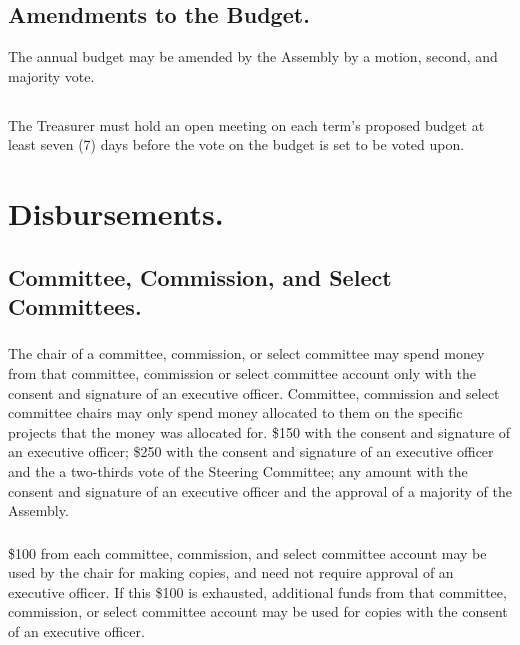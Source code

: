 \subsection{Amendments to the Budget.}
The annual budget may be amended by the Assembly by a motion, second, and majority vote.

\subsection{}
The Treasurer must hold an open meeting on each term's proposed budget at least seven (7) days before the vote on the budget is set to be voted upon.


\section{Disbursements.}

\subsection{Committee, Commission, and Select Committees.}  

\subsubsection{}
The chair of a committee, commission, or select committee may spend money from that committee, commission or select committee account only with the consent and signature of an executive officer. Committee, commission and select committee chairs may only spend money allocated to them on the specific projects that the money was allocated for.
\subsubsubsection{}
\$150 with the consent and signature of an executive officer;
\subsubsubsection{}
\$250 with the consent and signature of an executive officer and the a two-thirds vote of the Steering Committee;
\subsubsubsection{}
any amount with the consent and signature of an executive officer and the approval of a majority of the Assembly.
\subsubsection{}
\$100 from each committee, commission, and select committee account may be used by the chair for making copies, and need not require approval of an executive officer.  If this \$100 is exhausted, additional funds from that committee, commission, or select committee account may be used for copies with the consent of an executive officer.

